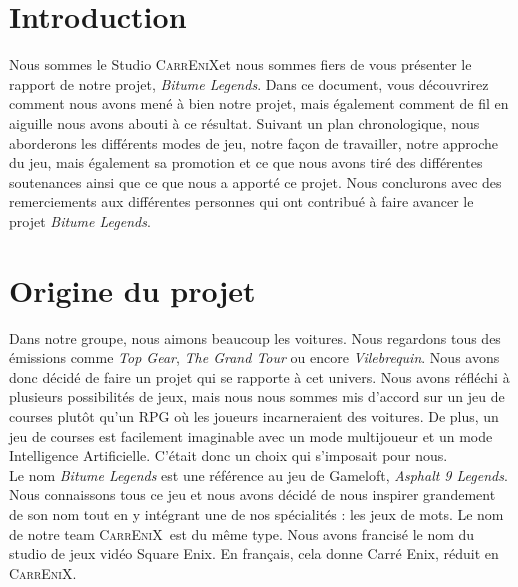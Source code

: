 \documentclass[a4paper,12pt]{article}
\newcommand{\btmlgs}{\textsl{Bitume Legends}}
\newcommand{\AI}{Intelligence Artificielle}
\newcommand{\CEX}{\textsc{CarrEniX}}
\begin{document}
  

    

    \newpage

    \tableofcontents

    \newpage

    \section*{Introduction}
    Nous sommes le Studio \CEX\;et nous sommes fiers de vous présenter le rapport de notre projet, \btmlgs. 
    Dans ce document, vous découvrirez comment nous avons mené à bien notre projet, mais également comment de fil en aiguille nous avons abouti à ce résultat. Suivant un plan chronologique, nous aborderons les différents modes de jeu, notre façon de travailler, notre approche du jeu, mais également sa promotion et ce que nous avons tiré des différentes soutenances ainsi que ce que nous a apporté ce projet. Nous conclurons avec des remerciements aux différentes personnes qui ont contribué à faire avancer le projet \btmlgs.


    \section{Origine du projet}
        Dans notre groupe, nous aimons beaucoup les voitures. Nous regardons tous des émissions comme 
        \textit{Top Gear}, \textit{The Grand Tour} ou encore \textit{Vilebrequin}. Nous avons donc décidé de faire
        un projet qui se rapporte à cet univers. Nous avons réfléchi à plusieurs possibilités de jeux, mais nous
        nous sommes mis d'accord sur un jeu de courses plutôt qu'un RPG où les joueurs incarneraient des voitures.
        De plus, un jeu de courses est facilement imaginable avec un mode multijoueur et un mode \AI. C'était donc un choix qui s'imposait pour nous.\\

        Le nom \textit{Bitume Legends} est une référence au jeu de Gameloft, \textit{Asphalt 9 Legends}.
        Nous connaissons tous ce jeu et nous avons décidé de nous inspirer grandement de son nom tout en y intégrant
        une de nos spécialités : les jeux de mots. Le nom de notre team \CEX\, est du même type. Nous avons 
        francisé le nom du studio de jeux vidéo Square Enix. En français, cela donne Carré Enix, réduit en
        \CEX.\\
    
\end{document}
